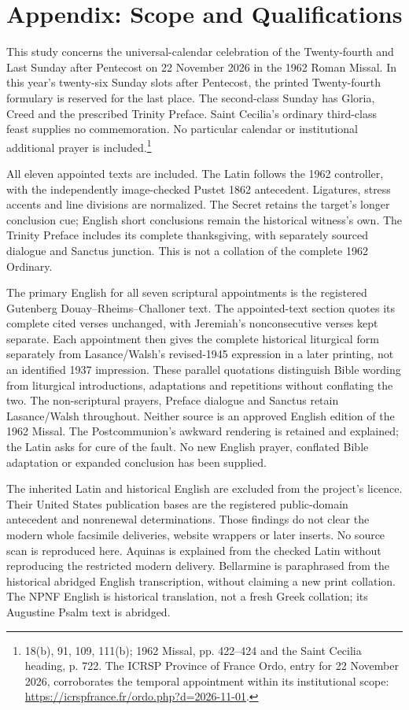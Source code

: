 \section{Appendix: Scope and Qualifications}

This study concerns the universal-calendar celebration of the Twenty-fourth
and Last Sunday after Pentecost on 22 November 2026 in the 1962 Roman
Missal. In this year's twenty-six Sunday slots after Pentecost, the
printed Twenty-fourth formulary is reserved for the last place.
The second-class Sunday has Gloria, Creed and the prescribed Trinity
Preface. Saint Cecilia's ordinary third-class feast supplies no
commemoration. No particular calendar or institutional additional prayer
is included.\footnote{ 18(b), 91, 109, 111(b);
1962 Missal, pp. 422--424 and the Saint Cecilia heading, p. 722.
The ICRSP Province of France Ordo, entry for 22 November 2026,
corroborates the temporal appointment within its institutional scope:
\url{https://icrspfrance.fr/ordo.php?d=2026-11-01}.}

All eleven appointed texts are included. The Latin follows the 1962
controller, with the independently image-checked Pustet 1862 antecedent.
Ligatures, stress accents and line divisions are normalized.
The Secret retains the target's longer conclusion cue; English short
conclusions remain the historical witness's own. The Trinity Preface
includes its complete thanksgiving, with separately sourced dialogue
and Sanctus junction. This is not a collation of the complete 1962
Ordinary.

The primary English for all seven scriptural appointments is the registered
Gutenberg Douay--Rheims--Challoner text. The appointed-text section quotes
its complete cited verses unchanged, with Jeremiah's nonconsecutive verses
kept separate. Each appointment then gives the complete historical liturgical
form separately from Lasance/Walsh's revised-1945 expression in a later
printing, not an identified 1937 impression. These parallel quotations
distinguish Bible wording from liturgical introductions, adaptations and
repetitions without conflating the two. The non-scriptural prayers,
Preface dialogue and Sanctus retain Lasance/Walsh throughout.
Neither source is an approved English edition of the 1962 Missal.
The Postcommunion's awkward rendering is retained and explained; the
Latin asks for cure of the fault. No new English prayer, conflated
Bible adaptation or expanded conclusion has been supplied.

The inherited Latin and historical English are excluded from the
project's licence. Their United States publication bases are the
registered public-domain antecedent and nonrenewal determinations.
Those findings do not clear the modern whole facsimile deliveries,
website wrappers or later inserts. No source scan is reproduced here.
Aquinas is explained from the checked Latin without reproducing the
restricted modern delivery. Bellarmine is paraphrased from the historical
abridged English transcription, without claiming a new print collation.
The NPNF English is historical translation, not a fresh Greek collation;
its Augustine Psalm text is abridged.

